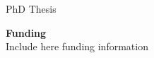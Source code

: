 
\thispagestyle{empty}



\begin{center}
{\large PhD Thesis} \\[0.15cm] 
{\large  \myProgram}
\end{center}


\hfill



\medskip


\noindent
{\large \textbf{Funding}}\\ [0.2cm]
Include here funding information \\[1.5cm]






